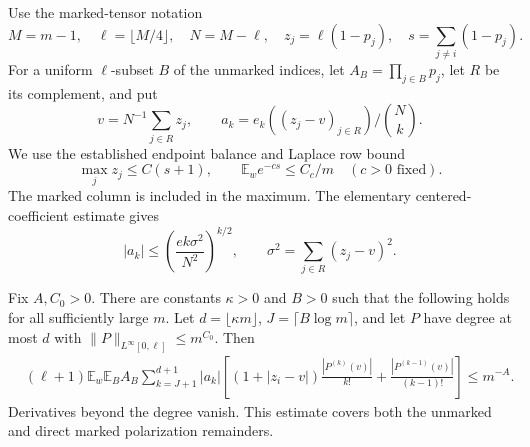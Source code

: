 \documentclass[11pt]{article}
\newcommand{\E}{\mathbb E}
\begin{document}
Use the marked-tensor notation
\[
 M=m-1,\quad \ell=\lfloor M/4\rfloor,\quad N=M-\ell,
 \quad z_j=\ell(1-p_j),\quad s=\sum_{j\ne i}(1-p_j).
\]
For a uniform $\ell$-subset $B$ of the unmarked indices, let
$A_B=\prod_{j\in B}p_j$, let $R$ be its complement, and put
\[
 v=N^{-1}\sum_{j\in R}z_j,\qquad
 a_k=e_k((z_j-v)_{j\in R})/\binom Nk.
\]
We use the established endpoint balance and Laplace row bound
\[
 \max_jz_j\le C(s+1),\qquad
 \E_w e^{-c s}\le C_c/m\quad(c>0\text{ fixed}).          \tag{3}
\]
The marked column is included in the maximum. The elementary
centered-coefficient estimate gives
\[
 |a_k|\le\left(\frac{e k\sigma^2}{N^2}\right)^{k/2},
 \qquad \sigma^2=\sum_{j\in R}(z_j-v)^2.                 \tag{4}
\]

\begin{theorem}\label{tail}
Fix $A,C_0>0$. There are constants $\kappa>0$ and $B>0$ such that
the following holds for all sufficiently large $m$.
Let $d=\lfloor\kappa m\rfloor$, $J=\lceil B\log m\rceil$, and
let $P$ have degree at most $d$ with
$\|P\|_{L^\infty[0,\ell]}\le m^{C_0}$.
Then
\begin{align*}
 &(\ell+1)\E_w\E_B A_B
 \sum_{k=J+1}^{d+1}|a_k|
 \left[(1+|z_i-v|)\frac{|P^{(k)}(v)|}{k!}
            +\frac{|P^{(k-1)}(v)|}{(k-1)!}\right]
 \le m^{-A}.
\end{align*}
Derivatives beyond the degree vanish. This estimate covers both the
unmarked and direct marked polarization remainders.
\end{theorem}
\end{document}
